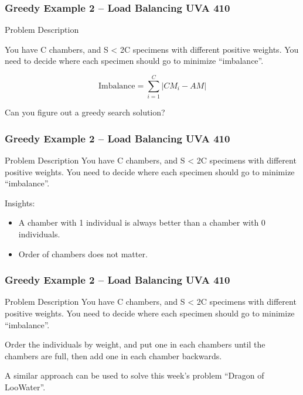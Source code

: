 \documentclass{beamer}
\begin{document}
\begin{frame}
  \frametitle{Greedy Example 2 -- Load Balancing UVA 410}

  \begin{block}{Problem Description}
    

  You have C chambers, and S < 2C specimens with different positive
  weights. You need to decide where each specimen should go to
  minimize ``imbalance''.
  \end{block}
  
  \begin{equation*}
    \text{Imbalance} = \sum_{i=1}^C |CM_i - AM|
  \end{equation*}

  Can you figure out a greedy search solution?
\end{frame}


\begin{frame}
  \frametitle{Greedy Example 2 -- Load Balancing UVA 410}

  \begin{block}{Problem Description}
  You have C chambers, and S < 2C specimens with different positive
  weights. You need to decide where each specimen should go to
  minimize ``imbalance''.
  \end{block}

  Insights:

  \begin{itemize}
  \item A chamber with 1 individual is always better than a chamber
    with 0 individuals.

    \medskip

  \item Order of chambers does not matter.
  \end{itemize}
\end{frame}

\begin{frame}
  \frametitle{Greedy Example 2 -- Load Balancing UVA 410}

  \begin{block}{Problem Description}
  You have C chambers, and S < 2C specimens with different positive
  weights. You need to decide where each specimen should go to
  minimize ``imbalance''.
  \end{block}

  \vfill

   Order the individuals by weight, and 
  put one in each chambers until the chambers are full, then add one
  in each chamber backwards.

  \bigskip

  A similar approach can be used to solve this week's problem ``Dragon
  of LooWater''.
\end{frame}
\end{document}
